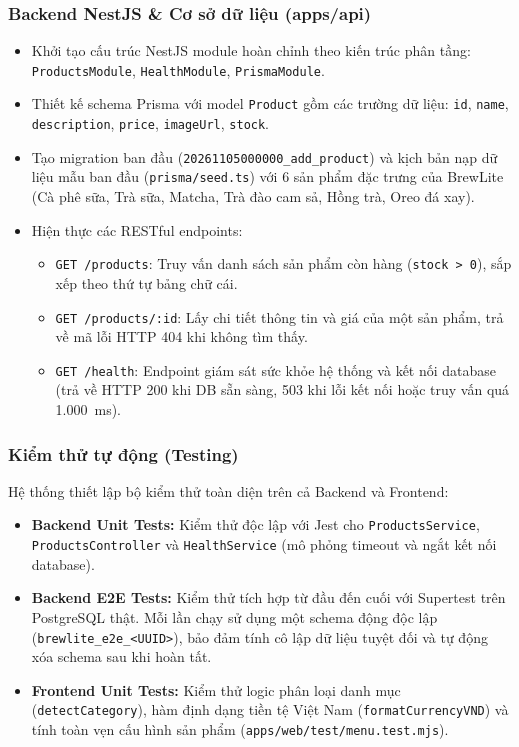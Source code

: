 \documentclass[a4paper]{article}
\begin{document}
\subsubsection{Backend NestJS \& Cơ sở dữ liệu (apps/api)}
\begin{itemize}
    \item Khởi tạo cấu trúc NestJS module hoàn chỉnh theo kiến trúc phân tầng: \texttt{ProductsModule}, \texttt{HealthModule}, \texttt{PrismaModule}.
    \item Thiết kế schema Prisma với model \texttt{Product} gồm các trường dữ liệu: \texttt{id}, \texttt{name}, \texttt{description}, \texttt{price}, \texttt{imageUrl}, \texttt{stock}.
    \item Tạo migration ban đầu (\texttt{20261105000000\_add\_product}) và kịch bản nạp dữ liệu mẫu ban đầu (\texttt{prisma/seed.ts}) với 6 sản phẩm đặc trưng của BrewLite (Cà phê sữa, Trà sữa, Matcha, Trà đào cam sả, Hồng trà, Oreo đá xay).
    \item Hiện thực các RESTful endpoints:
    \begin{itemize}
        \item \texttt{GET /products}: Truy vấn danh sách sản phẩm còn hàng (\texttt{stock > 0}), sắp xếp theo thứ tự bảng chữ cái.
        \item \texttt{GET /products/:id}: Lấy chi tiết thông tin và giá của một sản phẩm, trả về mã lỗi HTTP 404 khi không tìm thấy.
        \item \texttt{GET /health}: Endpoint giám sát sức khỏe hệ thống và kết nối database (trả về HTTP 200 khi DB sẵn sàng, 503 khi lỗi kết nối hoặc truy vấn quá 1.000~ms).
    \end{itemize}
\end{itemize}

\subsubsection{Kiểm thử tự động (Testing)}
Hệ thống thiết lập bộ kiểm thử toàn diện trên cả Backend và Frontend:
\begin{itemize}
    \item \textbf{Backend Unit Tests:} Kiểm thử độc lập với Jest cho \texttt{ProductsService}, \texttt{ProductsController} và \texttt{HealthService} (mô phỏng timeout và ngắt kết nối database).
    \item \textbf{Backend E2E Tests:} Kiểm thử tích hợp từ đầu đến cuối với Supertest trên PostgreSQL thật. Mỗi lần chạy sử dụng một schema động độc lập (\texttt{brewlite\_e2e\_<UUID>}), bảo đảm tính cô lập dữ liệu tuyệt đối và tự động xóa schema sau khi hoàn tất.
    \item \textbf{Frontend Unit Tests:} Kiểm thử logic phân loại danh mục (\texttt{detectCategory}), hàm định dạng tiền tệ Việt Nam (\texttt{formatCurrencyVND}) và tính toàn vẹn cấu hình sản phẩm (\texttt{apps/web/test/menu.test.mjs}).
\end{itemize}
\end{document}

